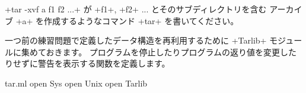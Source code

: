 \begin{exercise}
\label{ex/maketar}
\ml+tar -xvf a f1 f2 ...+ が \ml+f1+, \ml+f2+ ... とそのサブディレクトリを含む
アーカイブ \ml+a+ を作成するようなコマンド \ml+tar+ を書いてください。
\end{exercise}
\begin{answer}
一つ前の練習問題で定義したデータ構造を再利用するために \ml+Tarlib+ モジュールに集めておきます。
プログラムを停止したりプログラムの返り値を変更したりせずに警告を表示する関数を定義します。
%
\begin{listingcodefile}{tar.ml}
open Sys
open Unix
open Tarlib


\end{listingcodefile}
\end{answer}
